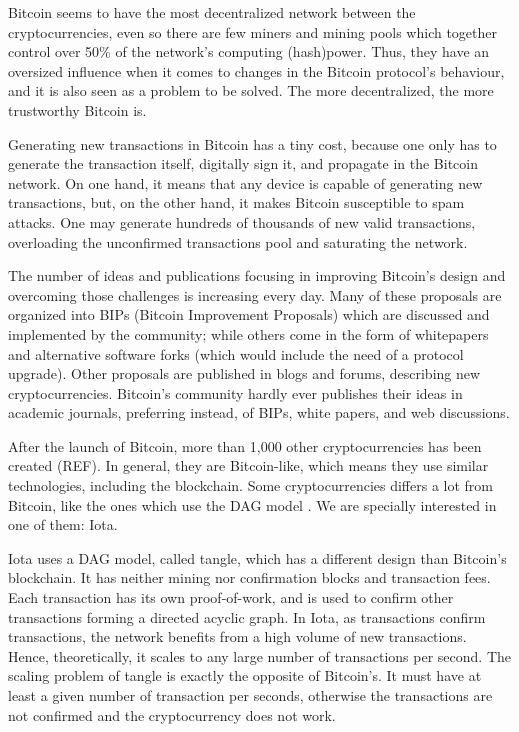 Bitcoin seems to have the most decentralized network between the cryptocurrencies, even so there are few miners and mining pools which together control over 50\% of the network’s computing (hash)power. Thus, they have an oversized influence when it comes to changes in the Bitcoin protocol's behaviour, and it is also seen as a problem to be solved. The more decentralized, the more trustworthy Bitcoin is.

Generating new transactions in Bitcoin has a tiny cost, because one only has to generate the transaction itself, digitally sign it, and propagate in the Bitcoin network. On one hand, it means that any device is capable of generating new transactions, but, on the other hand, it makes Bitcoin susceptible to spam attacks. One may generate hundreds of thousands of new valid transactions, overloading the unconfirmed transactions pool and saturating the network.

The number of ideas and publications focusing in improving Bitcoin's design and overcoming those challenges is increasing every day. Many of these proposals are organized into BIPs (Bitcoin Improvement Proposals) which are discussed and implemented by the community; while others come in the form of whitepapers and alternative software forks (which would include the need of a protocol upgrade). Other proposals are published in blogs and forums, describing new cryptocurrencies. Bitcoin's community hardly ever publishes their ideas in academic journals, preferring instead, of BIPs, white papers, and web discussions.

After the launch of Bitcoin, more than 1,000 other cryptocurrencies has been created (REF). In general, they are Bitcoin-like, which means they use similar technologies, including the blockchain. Some cryptocurrencies differs a lot from Bitcoin, like the ones which use the DAG model \citep{dagdiscussion2014, tangle2016, dagcoin2015, sompolinsky2013, lewenberg2015, vorick2015}. We are specially interested in one of them: Iota.

Iota uses a DAG model, called tangle, which has a different design than Bitcoin's blockchain. It has neither mining nor confirmation blocks and transaction fees. Each transaction has its own proof-of-work, and is used to confirm other transactions forming a directed acyclic graph. In Iota, as transactions confirm transactions, the network benefits from a high volume of new transactions. Hence, theoretically, it scales to any large number of transactions per second. The scaling problem of tangle is exactly the opposite of Bitcoin's. It must have at least a given number of transaction per seconds, otherwise the transactions are not confirmed and the cryptocurrency does not work.

